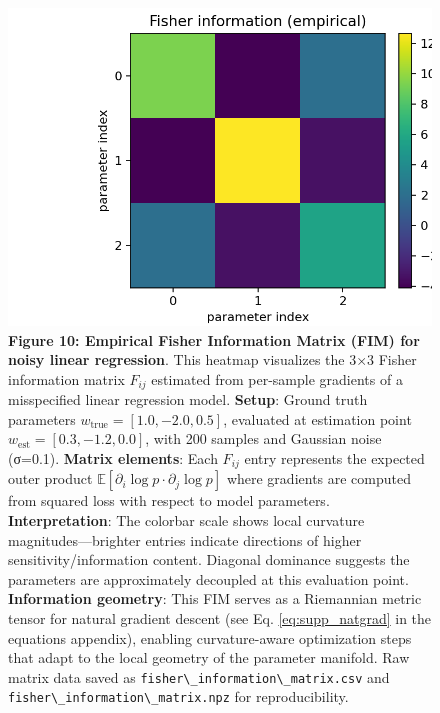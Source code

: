 \documentclass[
  10pt,
]{article}
\newcommand{\passthrough}[1]{#1}
\begin{document}
\begin{figure}
\centering
\includegraphics{../output/figures/fisher_information_matrix.png}
\caption{\textbf{Figure 10: Empirical Fisher Information Matrix (FIM)
for noisy linear regression}. This heatmap visualizes the 3×3 Fisher
information matrix \(F_{ij}\) estimated from per-sample gradients of a
misspecified linear regression model. \textbf{Setup}: Ground truth
parameters \(w_{\text{true}} = [1.0, -2.0, 0.5]\), evaluated at
estimation point \(w_{\text{est}} = [0.3, -1.2, 0.0]\), with 200 samples
and Gaussian noise (σ=0.1). \textbf{Matrix elements}: Each \(F_{ij}\)
entry represents the expected outer product
\(\mathbb{E}[\partial_i \log p \cdot \partial_j \log p]\) where
gradients are computed from squared loss with respect to model
parameters. \textbf{Interpretation}: The colorbar scale shows local
curvature magnitudes---brighter entries indicate directions of higher
sensitivity/information content. Diagonal dominance suggests the
parameters are approximately decoupled at this evaluation point.
\textbf{Information geometry}: This FIM serves as a Riemannian metric
tensor for natural gradient descent (see Eq. \eqref{eq:supp_natgrad} in
the equations appendix), enabling curvature-aware optimization steps
that adapt to the local geometry of the parameter manifold. Raw matrix
data saved as \passthrough{\lstinline!fisher\_information\_matrix.csv!}
and \passthrough{\lstinline!fisher\_information\_matrix.npz!} for
reproducibility.}
\end{figure}
\end{document}
